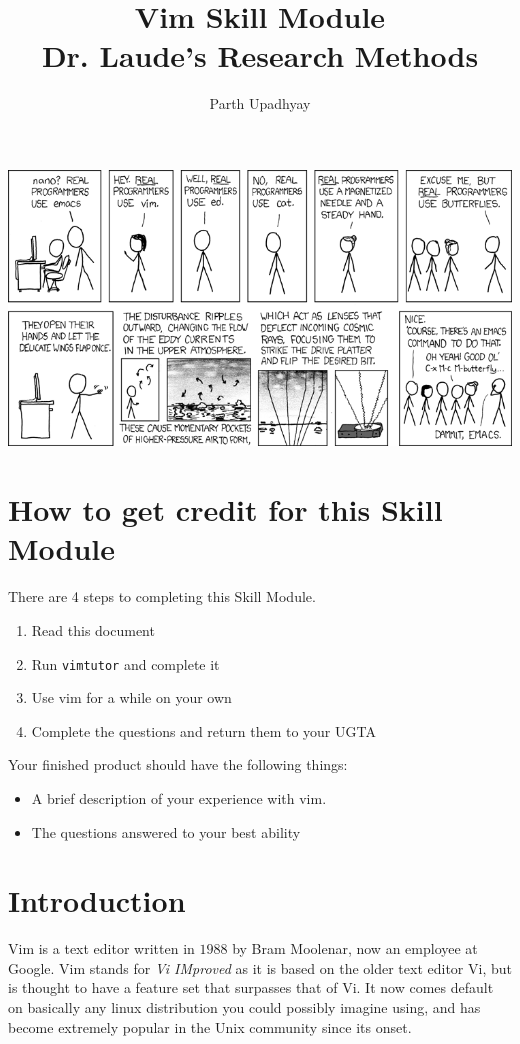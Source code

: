 

\title{Vim Skill Module\\
Dr. Laude's Research Methods}
\author{Parth Upadhyay}
\date{}


\maketitle

\begin{center}
\leavevmode
\includegraphics[scale=0.6]{images/real_programmers.png}
\end{center}

\section{How to get credit for this Skill Module}
There are 4 steps to completing this Skill Module.
\begin{enumerate}
\item Read this document
\item Run \texttt{vimtutor} and complete it
\item Use vim for a while on your own
\item Complete the questions and return them to your UGTA
\end{enumerate}

\noindent
Your finished product should have the following things:
\begin{itemize}
\item A brief description of your experience with vim.
\item The questions answered to your best ability
\end{itemize}

\section{Introduction}
Vim is a text editor written in $1988$ by Bram Moolenar, now an
employee at Google. Vim stands for {\em Vi IMproved} as it is based
on the older text editor Vi, but is thought to have a feature set
that surpasses that of Vi. It now comes default on basically any
linux distribution you could possibly imagine using, and has become
extremely popular in the Unix community since its onset. 


